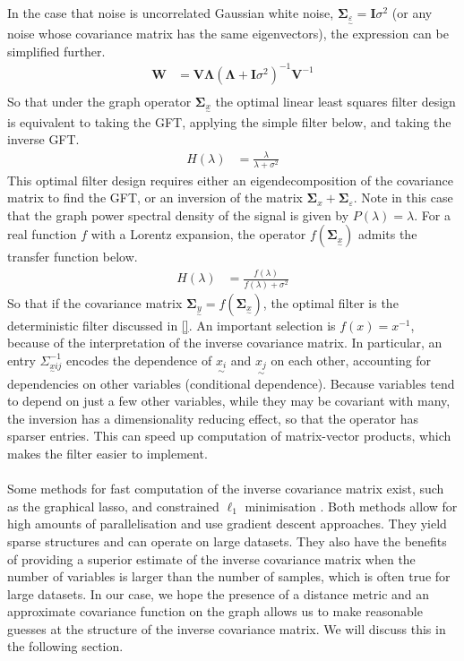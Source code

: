 \documentclass[12pt,a4paper]{article} %
\newcommand{\ve}[1]{\underset{\sim}{#1}}
\begin{document}
In the case that noise is uncorrelated Gaussian white noise, $\pmb{\Sigma}_{\ve{\varepsilon}}=\pmb{I}\sigma^2$ (or any noise whose covariance matrix has the same eigenvectors), the expression can be simplified further.
\begin{align*}
    \pmb{W}&=\pmb{V\Lambda} (\pmb{\Lambda} +\pmb{I}\sigma^2)^{-1}\pmb{V}^{-1}\\
\end{align*}
So that under the graph operator $\pmb{\Sigma}_{\ve{x}}$ the optimal linear least squares filter design is equivalent to taking the GFT, applying the simple filter below, and taking the inverse GFT.
\begin{align*}
    H(\lambda)&=\frac{\lambda}{\lambda+\sigma^2}
\end{align*}
This optimal filter design requires either an eigendecomposition of the covariance matrix to find the GFT, or an inversion of the matrix $\pmb{\Sigma}_x+\pmb{\Sigma}_\varepsilon$. Note in this case that the graph power spectral density of the signal is given by $P(\lambda)=\lambda$. For a real function $f$ with a Lorentz expansion, the operator $f(\pmb{\Sigma}_{\ve{x}})$ admits the transfer function below.
\begin{align*}
    H(\lambda)&=\frac{f(\lambda)}{f(\lambda)+\sigma^2}
\end{align*}
So that if the covariance matrix $\pmb{\Sigma}_{\ve{y}}=f(\pmb{\Sigma}_{\ve{x}})$, the optimal filter is the deterministic filter discussed in \ref{}. An important selection is $f(x)=x^{-1}$, because of the interpretation of the inverse covariance matrix. In particular, an entry $\Sigma_{\ve{x}ij}^{-1}$ encodes the dependence of $\ve{x_i}$ and $\ve{x_j}$ on each other, accounting for dependencies on other variables (conditional dependence). Because variables tend to depend on just a few other variables, while they may be covariant with many, the inversion has a dimensionality reducing effect, so that the operator has sparser entries. This can speed up computation of matrix-vector products, which makes the filter easier to implement.\\\\
Some methods for fast computation of the inverse covariance matrix exist, such as the graphical lasso, and constrained $\ell_1$ minimisation \cite{l1_min}\cite{glasso}. Both methods allow for high amounts of parallelisation and use gradient descent approaches. They yield sparse structures and can operate on large datasets. They also have the benefits of providing a superior estimate of the inverse covariance matrix when the number of variables is larger than the number of samples, which is often true for large datasets. In our case, we hope the presence of a distance metric and an approximate covariance function on the graph allows us to make reasonable guesses at the structure of the inverse covariance matrix. We will discuss this in the following section.
\end{document}
